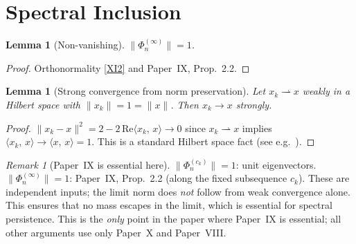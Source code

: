 \documentclass[12pt,a4paper]{amsart}
\newtheorem{lemma}[theorem]{Lemma}
\theoremstyle{definition}
\theoremstyle{remark}
\newtheorem{remark}[theorem]{Remark}
\newcommand{\ip}[2]{\langle #1,\, #2\rangle}
\begin{document}
\section{Spectral Inclusion}
\label{sec:spectral-inclusion}

\begin{lemma}[Non-vanishing]
\label{lem:nonvanish-limit}
$\|\Phi_n^{(\infty)}\|=1$.
\end{lemma}
\begin{proof}Orthonormality \eqref{XI2} and Paper~IX, Prop.~2.2.\end{proof}

\begin{lemma}[Strong convergence from norm preservation]
\label{lem:strong-conv}
Let $x_k\rightharpoonup x$ weakly in a Hilbert
space with $\|x_k\|=1=\|x\|$.
Then $x_k\to x$ strongly.
\end{lemma}
\begin{proof}
$\|x_k-x\|^2=2-2\,\mathrm{Re}\ip{x_k}{x}\to 0$
since $x_k\rightharpoonup x$ implies
$\ip{x_k}{x}\to\ip{x}{x}=1$.
This is a standard Hilbert space fact
(see e.g.\ \cite[Ch.~II]{ReedSimon1975}).
\end{proof}

\begin{remark}[Paper~IX is essential here]
\label{rem:norm-essential}
$\|\Phi_n^{(c_k)}\|=1$: unit eigenvectors.
$\|\Phi_n^{(\infty)}\|=1$: Paper~IX, Prop.~2.2
(along the fixed subsequence $c_k$).
These are independent inputs;
the limit norm does \emph{not} follow from
weak convergence alone.
This ensures that no mass escapes in the limit,
which is essential for spectral persistence.
This is the \emph{only} point in the paper
where Paper~IX is essential;
all other arguments use only Paper~X and
Paper~VIII.
\end{remark}
\end{document}
